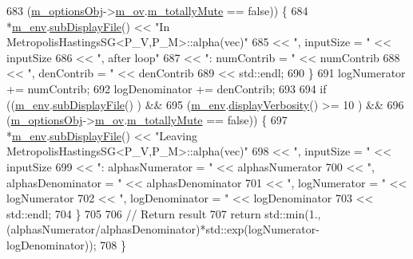\begin{DoxyCode}
683       (\hyperlink{class_q_u_e_s_o_1_1_metropolis_hastings_s_g_a5d0bc9f73d50d272aa6bfb5ef5939ef3}{m\_optionsObj}->\hyperlink{class_q_u_e_s_o_1_1_metropolis_hastings_s_g_options_a9d4792d9fc2dc5439b8ab489b0c236eb}{m\_ov}.\hyperlink{class_q_u_e_s_o_1_1_mh_options_values_af812309e81191e88dfdc87c5815141a3}{m\_totallyMute} == \textcolor{keyword}{false})) \{
684     *\hyperlink{class_q_u_e_s_o_1_1_metropolis_hastings_s_g_ac8ea061e55b920e0c8f9bce5c3f20e52}{m\_env}.\hyperlink{class_q_u_e_s_o_1_1_base_environment_a8a0064746ae8dddfece4229b9ad374d6}{subDisplayFile}() << \textcolor{stringliteral}{"In MetropolisHastingsSG<P\_V,P\_M>::alpha(vec)"}
685                            << \textcolor{stringliteral}{", inputSize = "}  << inputSize
686                            << \textcolor{stringliteral}{", after loop"}
687                            << \textcolor{stringliteral}{": numContrib = "} << numContrib
688                            << \textcolor{stringliteral}{", denContrib = "} << denContrib
689                            << std::endl;
690   \}
691   logNumerator   += numContrib;
692   logDenominator += denContrib;
693 
694   \textcolor{keywordflow}{if} ((\hyperlink{class_q_u_e_s_o_1_1_metropolis_hastings_s_g_ac8ea061e55b920e0c8f9bce5c3f20e52}{m\_env}.\hyperlink{class_q_u_e_s_o_1_1_base_environment_a8a0064746ae8dddfece4229b9ad374d6}{subDisplayFile}()                   ) &&
695       (\hyperlink{class_q_u_e_s_o_1_1_metropolis_hastings_s_g_ac8ea061e55b920e0c8f9bce5c3f20e52}{m\_env}.\hyperlink{class_q_u_e_s_o_1_1_base_environment_a1fe5f244fc0316a0ab3e37463f108b96}{displayVerbosity}() >= 10           ) &&
696       (\hyperlink{class_q_u_e_s_o_1_1_metropolis_hastings_s_g_a5d0bc9f73d50d272aa6bfb5ef5939ef3}{m\_optionsObj}->\hyperlink{class_q_u_e_s_o_1_1_metropolis_hastings_s_g_options_a9d4792d9fc2dc5439b8ab489b0c236eb}{m\_ov}.\hyperlink{class_q_u_e_s_o_1_1_mh_options_values_af812309e81191e88dfdc87c5815141a3}{m\_totallyMute} == \textcolor{keyword}{false})) \{
697     *\hyperlink{class_q_u_e_s_o_1_1_metropolis_hastings_s_g_ac8ea061e55b920e0c8f9bce5c3f20e52}{m\_env}.\hyperlink{class_q_u_e_s_o_1_1_base_environment_a8a0064746ae8dddfece4229b9ad374d6}{subDisplayFile}() << \textcolor{stringliteral}{"Leaving MetropolisHastingsSG<P\_V,P\_M>::alpha(vec)"}
698                            << \textcolor{stringliteral}{", inputSize = "}         << inputSize
699                            << \textcolor{stringliteral}{": alphasNumerator = "}   << alphasNumerator
700                            << \textcolor{stringliteral}{", alphasDenominator = "} << alphasDenominator
701                            << \textcolor{stringliteral}{", logNumerator = "}      << logNumerator
702                            << \textcolor{stringliteral}{", logDenominator = "}    << logDenominator
703                            << std::endl;
704   \}
705 
706   \textcolor{comment}{// Return result}
707   \textcolor{keywordflow}{return} std::min(1.,(alphasNumerator/alphasDenominator)*std::exp(logNumerator-logDenominator));
708 \}
\end{DoxyCode}
